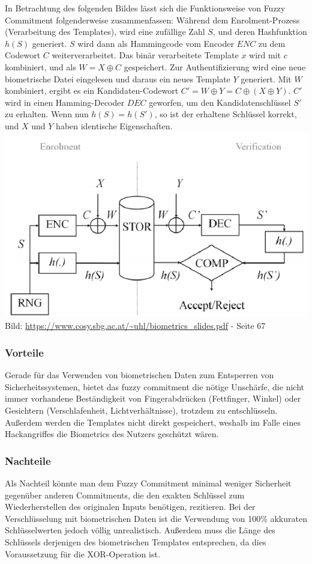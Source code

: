 \documentclass[12pt,a4paper]{article}
\begin{document}
\cite{fuzzy_commitment} 
\newline
In Betrachtung des folgenden Bildes lässt sich die Funktionsweise von Fuzzy Commitment folgenderweise zusammenfassen: Während dem Enrolment-Prozess (Verarbeitung des Templates), wird eine zufällige Zahl $S$, und deren Hashfunktion $h(S)$ generiert. $S$ wird dann als Hammingcode vom Encoder $ENC$ zu dem Codewort $C$ weiterverarbeitet. Das binär verarbeitete Template $x$ wird mit $c$ kombiniert, und als $W = X \oplus C$ gespeichert. Zur Authentifizierung wird eine neue biometrische Datei eingelesen und daraus ein neues Template $Y$ generiert. Mit $W$ kombiniert, ergibt es ein Kandidaten-Codewort $C' = W \oplus Y = C \oplus (X \oplus Y)$. $C'$ wird in einen Hamming-Decoder $DEC$ geworfen, um den Kandidatenschlüssel $S'$ zu erhalten. Wenn nun $h(S) = h(S')$, so ist der erhaltene Schlüssel korrekt, und $X$ und $Y$ haben identische Eigenschaften. \\
\includegraphics[scale=0.45]{fcs.png} \\
Bild: \url{https://www.cosy.sbg.ac.at/~uhl/biometrics_slides.pdf} - Seite 67
\subsubsection{Vorteile}
Gerade für das Verwenden von biometrischen Daten zum Entsperren von Sicherheitssystemen, bietet das fuzzy commitment die nötige Unschärfe, die nicht immer vorhandene Beständigkeit von Fingerabdrücken (Fettfinger, Winkel) oder Gesichtern (Verschlafenheit, Lichtverhältnisse), trotzdem zu entschlüsseln. Außerdem werden die Templates nicht direkt gespeichert, weshalb im Falle eines Hackangriffes die Biometrics des Nutzers geschützt wären.
\subsubsection{Nachteile}
Als Nachteil könnte man dem Fuzzy Commitment minimal weniger Sicherheit gegenüber anderen Commitments, die den exakten Schlüssel zum Wiederherstellen des originalen Inputs benötigen, rezitieren. Bei der Verschlüsselung mit biometrischen Daten ist die Verwendung von 100\% akkuraten Schlüsselwerten jedoch völlig unrealistisch. Außerdem muss die Länge des Schlüssels derjenigen des biometrischen Templates entsprechen, da dies Voraussetzung für die XOR-Operation ist.
\end{document}
